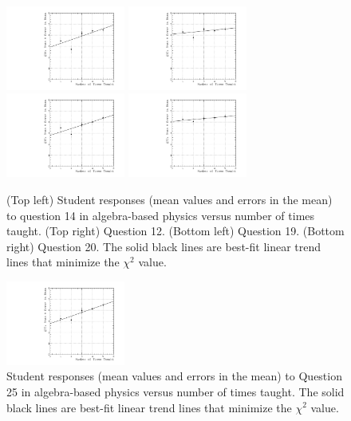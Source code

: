 \documentclass[../../main.tex]{subfiles}
\begin{document}
\begin{figure}[ht]
\centering
\includegraphics[width=0.35\textwidth]{Q14_algebra_based.pdf}
\includegraphics[width=0.35\textwidth]{Q12_algebra_based.pdf}
\includegraphics[width=0.35\textwidth]{Q19_algebra_based.pdf}
\includegraphics[width=0.35\textwidth]{Q20_algebra_based.pdf}
\caption{\label{fig:courses:intro_q14}  (Top left) Student responses (mean values and errors in the mean) to question 14 in algebra-based physics versus number of times taught.  (Top right) Question 12. (Bottom left) Question 19. (Bottom right) Question 20.  The solid black lines are best-fit linear trend lines that minimize the $\chi^2$ value.}
\end{figure}

\begin{figure}
\centering
\includegraphics[width=0.35\textwidth]{Q25_algebra_based.pdf}
\caption{\label{fig:courses:intro_q25}  Student responses (mean values and errors in the mean) to Question 25 in algebra-based physics versus number of times taught.  The solid black lines are best-fit linear trend lines that minimize the $\chi^2$ value.}
\end{figure}
\end{document}
